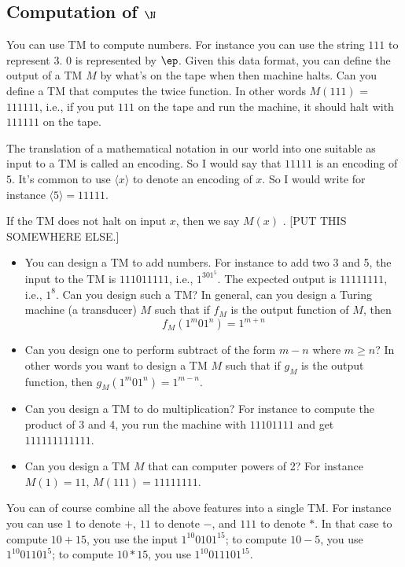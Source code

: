 \newpage
\subsection{Computation of $\N$}
  
\begin{eg}
You can use TM to compute numbers. For instance you can use the
string $111$ to represent $3$.
$0$ is represented by $\ep$.
Given this data format, you can
define the output of a TM $M$ by what's on the tape when then
machine halts. Can you define a TM that computes the twice
function. In other words $M(111)$ = $111111$, i.e., if you put
$111$ on the tape and run the machine, it should halt with
$111111$ on the tape.

The translation of a mathematical notation in our world
into one suitable as input to a TM is called an encoding.
So I would say that $11111$ is an encoding of $5$.
It's common to use $\langle x \rangle$ to denote an encoding of
$x$.
So I would write for instance $\langle 5 \rangle = 11111$.

If the TM does not halt on input $x$, then
we say $M(x)$ .
[PUT THIS SOMEWHERE ELSE.]

\begin{itemize}
 \item You can design a
 TM to add numbers. For instance to add two 3 and 5, the input to
 the TM is $111011111$, i.e., $1^301^5$.
 The expected output is $11111111$, i.e., $1^8$.
 Can
 you design such a TM?
 In general, can you design a Turing machine (a transducer)
 $M$ such that if $f_M$
 is the output function of $M$, then
 \[
 f_M(1^m 0 1^n) = 1^{m+n}
 \]
\item Can you design one to perform subtract
 of the form $m-n$ where $m\geq n$? In other words you want to
 design a TM $M$ such that if $g_M$ is the output function,
 then $g_M(1^m 0 1^n) = 1^{m-n}$.
 \item Can you design a TM to do multiplication? For instance to
 compute the product of 3 and 4, you run the machine with
 $11101111$ and get $111111111111$.
 \item Can you design a TM $M$ that can computer powers of 2? For instance
 $M(1) = 11$, $M(111) = 11111111$.
\end{itemize}
\end{eg}

You can of course combine all the above features into a single
TM.
For instance you can use $1$ to denote $+$, $11$ to denote $-$, and
$111$ to denote $*$.
In that case to compute $10 + 15$, you use the input
$1^{10}0101^{15}$;
to compute $10 - 5$, you use $1^{10}01101^{5}$;
to compute $10 * 15$, you use $1^{10}011101^{15}$.

